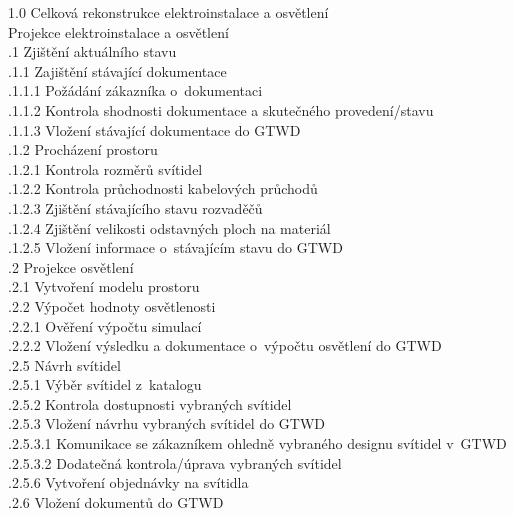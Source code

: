 \documentclass[a4paper, twoside, 11pt]{article}
\begin{document}
				1.0 Celková rekonstrukce elektroinstalace a osvětlení\\
				 Projekce elektroinstalace a osvětlení\\
				\indent {}.1 Zjištění aktuálního stavu\\
				\indent \indent {}.1.1 Zajištění stávající dokumentace\\
				\indent \indent \indent {}.1.1.1 Požádání zákazníka o~dokumentaci\\
				\indent \indent \indent {}.1.1.2 Kontrola shodnosti dokumentace a skutečného provedení/stavu\\
				\indent \indent \indent {}.1.1.3 Vložení stávající dokumentace do GTWD\\
				\indent \indent {}.1.2 Procházení prostoru\\
				\indent \indent \indent {}.1.2.1 Kontrola rozměrů svítidel\\
				\indent \indent \indent {}.1.2.2 Kontrola průchodnosti kabelových průchodů\\
				\indent \indent \indent {}.1.2.3 Zjištění stávajícího stavu rozvaděčů\\
				\indent \indent \indent {}.1.2.4 Zjištění velikosti odstavných ploch na materiál\\
				\indent \indent \indent {}.1.2.5 Vložení informace o~stávajícím stavu do GTWD\\

			\indent {}.2 Projekce osvětlení\\
			\indent \indent {}.2.1 Vytvoření modelu prostoru\\
			\indent \indent {}.2.2 Výpočet hodnoty osvětlenosti\\
			\indent \indent \indent {}.2.2.1 Ověření výpočtu simulací\\
			\indent \indent \indent {}.2.2.2 Vložení výsledku a dokumentace o~výpočtu osvětlení do GTWD\\
			\indent \indent {}.2.5 Návrh svítidel\\
				\indent \indent \indent {}.2.5.1 Výběr svítidel z~katalogu\\
				\indent \indent \indent {}.2.5.2 Kontrola dostupnosti vybraných svítidel\\
				\indent \indent \indent {}.2.5.3 Vložení návrhu vybraných svítidel do GTWD\\
				\indent \indent \indent \indent {}.2.5.3.1 Komunikace se zákazníkem ohledně vybraného designu svítidel v~GTWD\\
				\indent \indent \indent \indent {}.2.5.3.2 Dodatečná kontrola/úprava vybraných svítidel\\
				\indent \indent \indent {}.2.5.6 Vytvoření objednávky na svítidla\\
			\indent \indent \indent {}.2.6 Vložení dokumentů do GTWD\\
			
\end{document}
